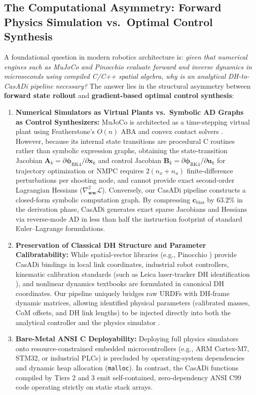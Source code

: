 \documentclass[fleqn,10pt]{article}
\begin{document}
	\subsection*{The Computational Asymmetry: Forward Physics Simulation vs.\ Optimal Control Synthesis}
	
	A foundational question in modern robotics architecture is: \textit{given that numerical engines such as MuJoCo and Pinocchio evaluate forward and inverse dynamics in microseconds using compiled C/C++ spatial algebra, why is an analytical DH-to-CasADi pipeline necessary?} The answer lies in the structural asymmetry between \textbf{forward state rollout} and \textbf{gradient-based optimal control synthesis}:
	\begin{enumerate}
		\item \textbf{Numerical Simulators as Virtual Plants vs.\ Symbolic AD Graphs as Control Synthesizers:} MuJoCo is architected as a time-stepping virtual plant using Featherstone's $O(n)$ ABA and convex contact solvers \cite{todorov2012mujoco, featherstone2014rigid}. However, because its internal state transitions are procedural C routines rather than symbolic expression graphs, obtaining the state-transition Jacobian $\bm{A}_k = \partial \bm{\phi}_{\text{RK4}}/\partial \bm{x}_k$ and control Jacobian $\bm{B}_k = \partial \bm{\phi}_{\text{RK4}}/\partial \bm{u}_k$ for trajectory optimization or NMPC requires $2(n_x + n_u)$ finite-difference perturbations per shooting node, and cannot provide exact second-order Lagrangian Hessians ($\nabla_{\bm{w}\bm{w}}^2 \mathcal{L}$). Conversely, our CasADi pipeline constructs a closed-form symbolic computation graph. By compressing $\mathbf{c}_{\text{bias}}$ by $63.2\%$ in the derivation phase, CasADi generates exact sparse Jacobians and Hessians via reverse-mode AD in less than half the instruction footprint of standard Euler--Lagrange formulations.
		\item \textbf{Preservation of Classical DH Structure and Parameter Calibratability:} While spatial-vector libraries (e.g., Pinocchio \cite{carpentier2019pinocchio}) provide CasADi bindings in local link coordinates, industrial robot controllers, kinematic calibration standards (such as Leica laser-tracker DH identification \cite{zhou2026gtpn, asr2026calibration}), and nonlinear dynamics textbooks \cite{craig2005introduction, spong2020robot, siciliano2010robotics} are formulated in canonical DH coordinates. Our pipeline uniquely bridges raw URDFs with DH-frame dynamic matrices, allowing identified physical parameters (calibrated masses, CoM offsets, and DH link lengths) to be injected directly into both the analytical controller and the physics simulator \cite{asr2026calibration}.
		\item \textbf{Bare-Metal ANSI C Deployability:} Deploying full physics simulators onto resource-constrained embedded microcontrollers (e.g., ARM Cortex-M7, STM32, or industrial PLCs) is precluded by operating-system dependencies and dynamic heap allocation (\texttt{malloc}). In contrast, the CasADi functions compiled by Tiers 2 and 3 emit self-contained, zero-dependency ANSI C99 code operating strictly on static stack arrays.
	\end{enumerate}
	
\end{document}
